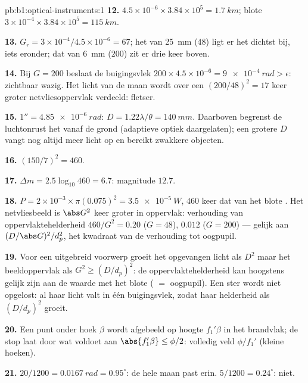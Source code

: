 \begin{solution}{pb:b1:optical-instruments:1}
\textbf{12.} $4.5\times10^{-6} \times 3.84\times10^5 = \qty{1.7}{km}$;
blote  $3\times10^{-4} \times 3.84\times10^5 = \qty{115}{km}$.

\textbf{13.} $G_r = 3\times10^{-4}/4.5\times10^{-6} = 67$; het  van \qty{25}{mm}
($48$) ligt er het dichtst bij, iets eronder; dat van \qty{6}{mm} ($200$) zit er
drie keer boven.

\textbf{14.} Bij $G = 200$ beslaat de buigingsvlek $200 \times 4.5
\times10^{-6} = \qty{9e-4}{rad} > \epsilon$: zichtbaar wazig. Het licht van
de maan wordt over een $(200/48)^2 = 17$ keer groter netvliesoppervlak
verdeeld: fletser.

\textbf{15.} $1'' = \qty{4.85e-6}{rad}$: $D = 1.22\lambda/\theta =
\qty{140}{mm}$. Daarboven begrenst de luchtonrust het  vanaf
de grond (adaptieve optiek daargelaten); een grotere $D$ vangt nog altijd meer
licht op en bereikt zwakkere objecten.

\textbf{16.} $(150/7)^2 = 460$.

\textbf{17.} $\Delta m = 2.5\log_{10}460 = 6.7$: magnitude $12.7$.

\textbf{18.} $P = 2\times10^{-3} \times \pi(0.075)^2 = \qty{3.5e-5}{W}$,
$460$ keer dat van het blote . Het netvliesbeeld is $\abs G^2$ keer
groter in oppervlak: verhouding van oppervlaktehelderheid $460/G^2 = 0.20$ ($G = 48$),
$0.012$ ($G = 200$) --- gelijk aan $(D/\abs G)^2/d_p^2$, het kwadraat van de
verhouding  tot oogpupil.

\textbf{19.} Voor een uitgebreid voorwerp groeit het opgevangen licht als $D^2$
maar het beeldoppervlak als $G^2 \geq (D/d_p)^2$: de oppervlaktehelderheid kan
hoogstens gelijk zijn aan de waarde met het blote  ( $=$ oogpupil).
Een ster wordt niet opgelost: al haar licht valt in één buigingsvlek, zodat haar
helderheid als $(D/d_p)^2$ groeit.

\textbf{20.} Een punt onder hoek $\beta$ wordt afgebeeld op hoogte $f_1'\beta$ in
het brandvlak; de stop laat door wat voldoet aan $\abs{f_1'\beta} \leq \phi/2$: volledig
veld $\phi/f_1'$ (kleine hoeken).

\textbf{21.} $20/1200 = \qty{0.0167}{rad} = 0.95^\circ$: de hele maan
past erin. $5/1200 = 0.24^\circ$: niet.


\end{solution}
